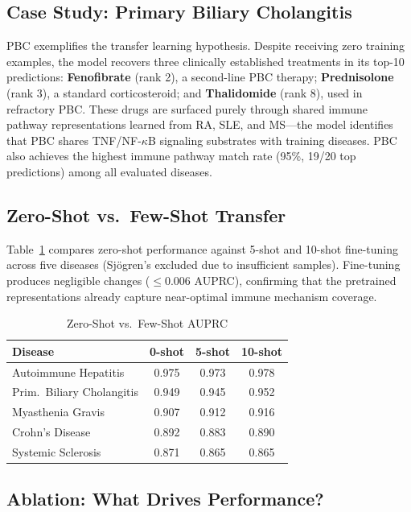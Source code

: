 \documentclass[conference]{IEEEtran}
\begin{document}
\subsection{Case Study: Primary Biliary Cholangitis}

PBC exemplifies the transfer learning hypothesis. Despite receiving zero training examples, the model recovers three clinically established treatments in its top-10 predictions: \textbf{Fenofibrate} (rank 2), a second-line PBC therapy; \textbf{Prednisolone} (rank 3), a standard corticosteroid; and \textbf{Thalidomide} (rank 8), used in refractory PBC. These drugs are surfaced purely through shared immune pathway representations learned from RA, SLE, and MS---the model identifies that PBC shares TNF/NF-$\kappa$B signaling substrates with training diseases. PBC also achieves the highest immune pathway match rate (95\%, 19/20 top predictions) among all evaluated diseases.

\subsection{Zero-Shot vs.\ Few-Shot Transfer}

Table~\ref{tab:fewshot} compares zero-shot performance against 5-shot and 10-shot fine-tuning across five diseases (Sj\"{o}gren's excluded due to insufficient samples). Fine-tuning produces negligible changes ($\leq 0.006$ AUPRC), confirming that the pretrained representations already capture near-optimal immune mechanism coverage.

\begin{table}[!t]
\caption{Zero-Shot vs.\ Few-Shot AUPRC}
\label{tab:fewshot}
\centering
\footnotesize
\renewcommand{\arraystretch}{1.3}
\begin{tabular}{lccc}
\toprule
\textbf{Disease} & \textbf{0-shot} & \textbf{5-shot} & \textbf{10-shot} \\
\midrule
Autoimmune Hepatitis & 0.975 & 0.973 & 0.978 \\
Prim.\ Biliary Cholangitis & 0.949 & 0.945 & 0.952 \\
Myasthenia Gravis & 0.907 & 0.912 & 0.916 \\
Crohn's Disease & 0.892 & 0.883 & 0.890 \\
Systemic Sclerosis & 0.871 & 0.865 & 0.865 \\
\bottomrule
\end{tabular}
\end{table}

\subsection{Ablation: What Drives Performance?}
\end{document}

